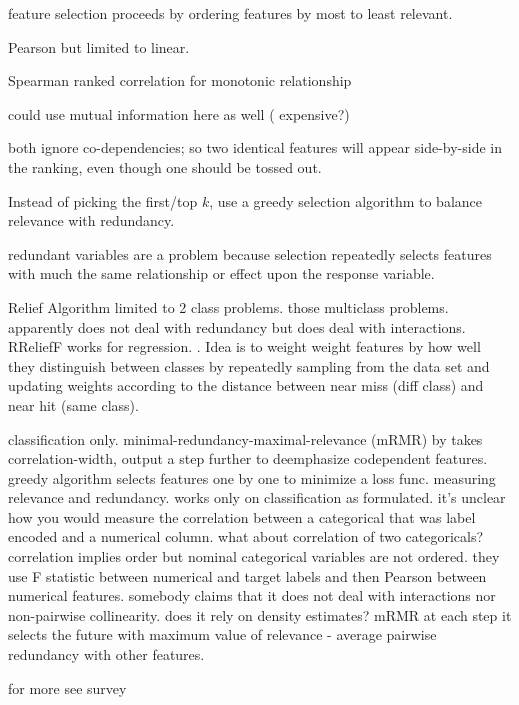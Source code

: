 \documentclass[12pt]{article}
\newcommand{\todo}[1]{{{\color{red}{[#1]}}}}
\begin{document}
 feature selection proceeds by ordering features by most to least relevant. 
 
Pearson but limited to linear.

Spearman ranked correlation  for monotonic relationship

 could use mutual information here as well ( expensive?)
 
 both ignore co-dependencies; so two identical features will appear side-by-side in the ranking, even though one should be tossed out.

Instead of picking the first/top $k$, use a greedy selection algorithm to balance relevance with redundancy.

redundant variables are a problem because selection repeatedly selects features with much the same relationship or effect upon the response variable.

\todo{We deal with all possible combinations for codependency's because of the nature of the partial dependence mechanism.}

Relief Algorithm \cite{relief} limited to 2 class problems. \cite{ReliefF}  those multiclass problems. apparently does not deal with redundancy but does deal with interactions. RReliefF works for regression. \cite{RReliefF}. Idea is to weight weight features by how well they distinguish between classes by repeatedly sampling from the data set and updating weights according to the distance between near miss (diff class) and near hit (same class).

 classification only. minimal-redundancy-maximal-relevance (mRMR) by \cite{mRMR}  takes correlation-width, output a step further to deemphasize codependent features. greedy algorithm selects features one by one to minimize a loss func.  measuring relevance and redundancy.  works only on classification as formulated. it's unclear how you would measure the correlation between a categorical that was label encoded and a numerical column. what about correlation of two categoricals? correlation implies order but nominal categorical variables are not ordered. they use F statistic between numerical and target labels and then Pearson between numerical features. somebody claims that it does not deal with interactions nor non-pairwise collinearity. does it rely on density estimates? mRMR  at each step it selects the future with maximum value of relevance - average pairwise redundancy with other features. \todo{should we bother putting in the equation?}
 
 for more see survey \cite{survey}
\end{document}
